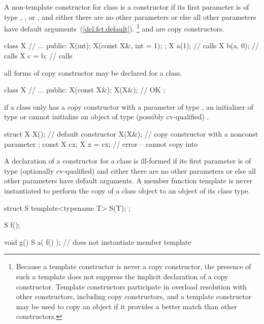 \pnum
{}%
A non-template constructor for class
is
a
constructor if its first parameter is of type
,
,
or
,
and either there are no other parameters
or else all other parameters have default arguments~(\ref{dcl.fct.default}).%
\footnote{Because a template constructor is never a copy constructor, the
presence of such a template does not suppress the implicit declaration of a
copy constructor. Template constructors participate in overload resolution
with other constructors, including copy constructors, and a template
constructor may be used to copy an object if it provides a better match
than other constructors.}
\enterexample
{}
and
are copy constructors.

\begin{codeblock}
class X {
    // ...
public:
    X(int);
    X(const X&, int = 1);
};
X a(1);				// calls 
X b(a, 0);			// calls 
X c = b;			// calls 
\end{codeblock}
\exitexampleb
\enternote
all forms of copy constructor may be declared for a class.
\enterexample

\begin{codeblock}
class X {
	// ...
public:
	X(const X&);
	X(X&);			// OK
};
\end{codeblock}
\exitexampleb
\exitnoteb
\enternote
if a class
only has a copy constructor with a parameter of type
,
an initializer of type
or
cannot initialize an object of type (possibly cv-qualified)
.
\enterexample

\begin{codeblock}
struct X {
	X();			// default constructor
	X(X&);			// copy constructor with a nonconst parameter
};
const X cx;
X x = cx;			// error --  cannot copy  into 
\end{codeblock}
\exitexampleb
\exitnoteb

\pnum
A declaration of a constructor for a class
is ill-formed if its first parameter is of type (optionally cv-qualified)
and either there are no other parameters or else all other parameters have
default arguments.
A member function template is never instantiated to perform the copy of a
class object to an object of its class type.
\enterexample
\begin{codeblock}
struct S {
	template<typename T> S(T);
};

S f();

void g() {
	S a( f() ); // does not instantiate member template
}
\end{codeblock}
\exitexampleb

